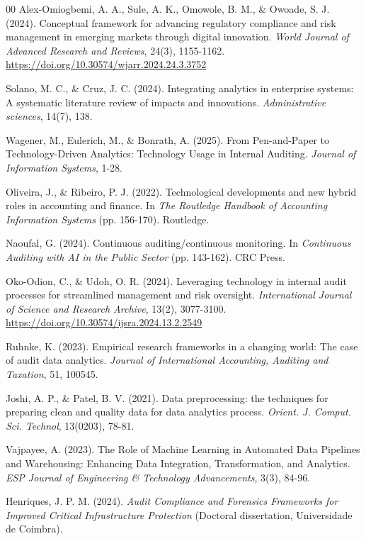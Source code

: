 \documentclass[conference]{IEEEtran}
\begin{document}
\begin{thebibliography}{00}
 Alex-Omiogbemi, A. A., Sule, A. K., Omowole, B. M., \& Owoade, S. J. (2024). Conceptual framework for advancing regulatory compliance and risk management in emerging markets through digital innovation. \emph{World Journal of Advanced Research and Reviews}, 24(3), 1155-1162. \url{https://doi.org/10.30574/wjarr.2024.24.3.3752}

 Solano, M. C., \& Cruz, J. C. (2024). Integrating analytics in enterprise systems: A systematic literature review of impacts and innovations. \emph{Administrative sciences}, 14(7), 138.

 Wagener, M., Eulerich, M., \& Bonrath, A. (2025). From Pen-and-Paper to Technology-Driven Analytics: Technology Usage in Internal Auditing. \emph{Journal of Information Systems}, 1-28.

 Oliveira, J., \& Ribeiro, P. J. (2022). Technological developments and new hybrid roles in accounting and finance. In \emph{The Routledge Handbook of Accounting Information Systems} (pp. 156-170). Routledge.

 Naoufal, G. (2024). Continuous auditing/continuous monitoring. In \emph{Continuous Auditing with AI in the Public Sector} (pp. 143-162). CRC Press.

 Oko-Odion, C., \& Udoh, O. R. (2024). Leveraging technology in internal audit processes for streamlined management and risk oversight. \emph{International Journal of Science and Research Archive}, 13(2), 3077-3100. \url{https://doi.org/10.30574/ijsra.2024.13.2.2549}

 Ruhnke, K. (2023). Empirical research frameworks in a changing world: The case of audit data analytics. \emph{Journal of International Accounting, Auditing and Taxation}, 51, 100545.

 Joshi, A. P., \& Patel, B. V. (2021). Data preprocessing: the techniques for preparing clean and quality data for data analytics process. \emph{Orient. J. Comput. Sci. Technol}, 13(0203), 78-81.

 Vajpayee, A. (2023). The Role of Machine Learning in Automated Data Pipelines and Warehousing: Enhancing Data Integration, Transformation, and Analytics. \emph{ESP Journal of Engineering \& Technology Advancements}, 3(3), 84-96.

 Henriques, J. P. M. (2024). \emph{Audit Compliance and Forensics Frameworks for Improved Critical Infrastructure Protection} (Doctoral dissertation, Universidade de Coimbra).


\end{thebibliography}
\end{document}
